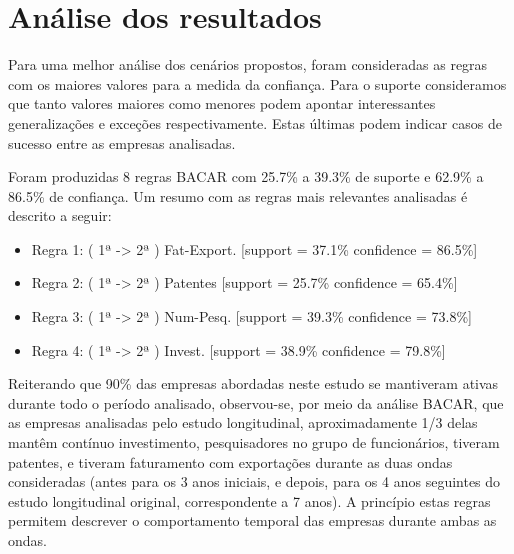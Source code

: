 \documentclass[kdmile,a4paper]{kdmile} %
\begin{document}
\section{Análise dos resultados}

Para uma melhor análise dos cenários propostos, foram consideradas as regras com os maiores valores para a medida da confiança. Para o suporte consideramos que tanto valores maiores como menores podem apontar interessantes generalizações e exceções respectivamente. Estas últimas podem indicar casos de sucesso entre as empresas analisadas.

Foram produzidas 8 regras BACAR com 25.7\% a 39.3\% de suporte e 62.9\% a 86.5\% de confiança. Um resumo com as regras mais relevantes analisadas é descrito a seguir:

\begin{itemize}
    \item Regra 1: ( 1ª -> 2ª ) Fat-Export. [support = 37.1\% confidence = 86.5\%]
    \item Regra 2: ( 1ª -> 2ª ) Patentes [support = 25.7\% confidence = 65.4\%]
    \item Regra 3: ( 1ª -> 2ª ) Num-Pesq. [support = 39.3\% confidence = 73.8\%]
    \item Regra 4: ( 1ª -> 2ª ) Invest. [support = 38.9\% confidence = 79.8\%]
\end{itemize}

Reiterando que 90\% das empresas abordadas neste estudo se mantiveram ativas durante todo o período analisado, observou-se, por meio da análise BACAR, que as empresas analisadas pelo estudo longitudinal, aproximadamente 1/3 delas mantêm contínuo investimento, pesquisadores no grupo de funcionários, tiveram patentes, e tiveram faturamento com exportações durante as duas ondas consideradas (antes para os 3 anos iniciais, e depois, para os 4 anos seguintes do estudo longitudinal original, correspondente a 7 anos). A princípio estas regras permitem descrever o comportamento temporal das empresas durante ambas as ondas.

\end{document}

